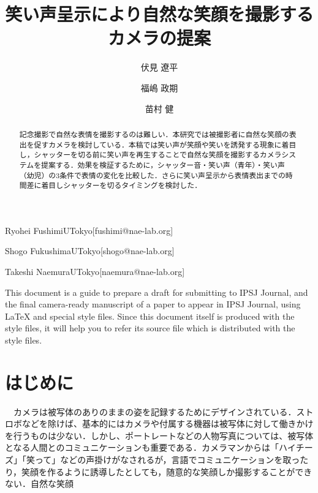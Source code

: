 \documentclass[submit,techreq]{ec2014}
\begin{document}
\title{笑い声呈示により自然な笑顔を撮影するカメラの提案}


\author{伏見 遼平}{Ryohei Fushimi}{UTokyo}[fushimi@nae-lab.org]
\author{福嶋 政期}{Shogo Fukushima}{UTokyo}[shogo@nae-lab.org]
\author{苗村 健}{Takeshi Naemura}{UTokyo}[naemura@nae-lab.org]

\begin{abstract}
記念撮影で自然な表情を撮影するのは難しい．本研究では被撮影者に自然な笑顔の表出を促すカメラを検討している．本稿では笑い声が笑顔や笑いを誘発する現象に着目し，シャッターを切る前に笑い声を再生することで自然な笑顔を撮影するカメラシステムを提案する．効果を検証するために，シャッター音・笑い声（青年）・笑い声（幼児）の3条件で表情の変化を比較した．さらに笑い声呈示から表情表出までの時間差に着目しシャッターを切るタイミングを検討した．
\end{abstract}


%
\begin{eabstract}
This document is a guide to prepare a draft for submitting to IPSJ
Journal, and the final camera-ready manuscript of a paper to appear in
IPSJ Journal, using {\LaTeX} and special style files.  Since this
document itself is produced with the style files, it will help you to
refer its source file which is distributed with the style files.
\end{eabstract}





\maketitle

\section{はじめに}

　カメラは被写体のありのままの姿を記録するためにデザインされている．ストロボなどを除けば、基本的にはカメラや付属する機器は被写体に対して働きかけを行うものは少ない．しかし、ポートレートなどの人物写真については、被写体となる人間とのコミュニケーションも重要である．カメラマンからは「ハイチーズ」「笑って」などの声掛けがなされるが，言語でコミュニケーションを取ったり，笑顔を作るように誘導したとしても，随意的な笑顔しか撮影することができない．自然な笑顔
\end{document}

